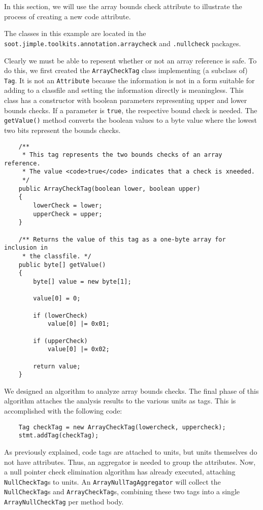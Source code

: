 \documentclass{article}
\begin{document}
In this section, we will use the array bounds check attribute to 
illustrate the process of creating a new code attribute.

The classes in this example are located in the {\tt
soot.jimple.toolkits.annotation.arraycheck} and {\tt .nullcheck} packages.

Clearly we must be able to repesent whether or not an array reference
is safe.  To do this, we first created the {\tt ArrayCheckTag} class
implementing (a subclass of) {\tt Tag}.  It is not an {\tt Attribute}
because the information is not in a form suitable for adding to a 
classfile and setting the information directly is meaningless.  
This class has a constructor
with boolean parameters representing upper and lower bounds checks. If
a parameter is {\tt true}, the respective bound check is needed. The
{\tt getValue()} method converts the boolean values to a byte value
where the lowest two bits represent the bounds checks.

\begin{verbatim}
    /** 
     * This tag represents the two bounds checks of an array reference.
     * The value <code>true</code> indicates that a check is xneeded.
     */
    public ArrayCheckTag(boolean lower, boolean upper)
    {
        lowerCheck = lower;
        upperCheck = upper;
    }

    /** Returns the value of this tag as a one-byte array for inclusion in
     * the classfile. */
    public byte[] getValue()
    {
        byte[] value = new byte[1];

        value[0] = 0;
        
        if (lowerCheck)
            value[0] |= 0x01;
        
        if (upperCheck)
            value[0] |= 0x02;

        return value;
    }
\end{verbatim}

We designed an algorithm to analyze array bounds checks. The final
phase of this algorithm attaches the analysis results to the various
units as tags. This is accomplished with the following code:
\begin{verbatim}
    Tag checkTag = new ArrayCheckTag(lowercheck, uppercheck);
    stmt.addTag(checkTag);
\end{verbatim}

As previously explained, code tags are attached to units, but units
themselves do not have attributes. Thus, an aggregator
is needed to group the attributes. Now, a null pointer check
elimination algorithm has already executed, attaching {\tt NullCheckTag}s to
units. An {\tt ArrayNullTagAggregator} will collect the {\tt NullCheckTag}s
and {\tt ArrayCheckTag}s, combining these two tags into 
a single {\tt ArrayNullCheckTag} per method body.
\end{document}
